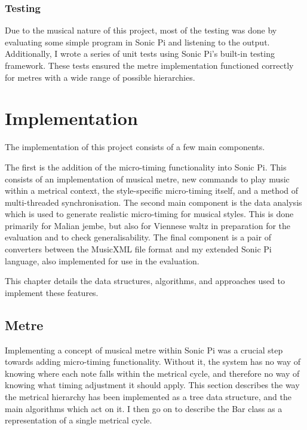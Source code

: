 \documentclass[12pt,twoside,openright]{report}
\begin{document}
\subsection{Testing}

Due to the musical nature of this project, most of the testing was done by
evaluating some simple program in Sonic Pi and listening to the output.
Additionally, I wrote a series of unit tests using Sonic Pi's built-in testing
framework. These tests ensured the metre implementation functioned correctly for
metres with a wide range of possible hierarchies.





\chapter{Implementation} \label{implementation}

The implementation of this project consists of a few main components.

The first is the addition of the micro-timing functionality into Sonic Pi.
This consists of an implementation of musical metre, new commands to play music
within a metrical context, the style-specific micro-timing itself, and a method
of multi-threaded synchronisation. The second main component is the data
analysis which is used to generate realistic micro-timing for musical styles.
This is done primarily for Malian jembe, but also for Viennese waltz in
preparation for the evaluation and to check generalisability. The final component is a pair of converters
between the MusicXML file format and my extended Sonic Pi language, also
implemented for use in the evaluation.

This chapter details the data structures, algorithms, and approaches used to
implement these features.



\section{Metre} \label{metre_implementation}

Implementing a concept of musical metre within Sonic Pi was a crucial step
towards adding micro-timing functionality. Without it, the system has no way of
knowing where each note falls within the metrical cycle, and therefore no way of
knowing what timing adjustment it should apply. This section describes the way
the metrical hierarchy has been implemented as a tree data structure, and the
main algorithms which act on it. I then go on to describe the Bar class as a
representation of a single metrical cycle.
\end{document}
